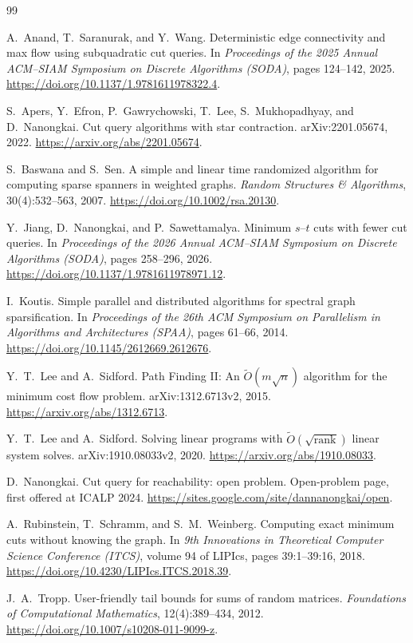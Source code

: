 \documentclass[11pt]{article}
\theoremstyle{definition}
\begin{document}
\small\sloppy
\begin{thebibliography}{99}

A.~Anand, T.~Saranurak, and Y.~Wang.
\newblock Deterministic edge connectivity and max flow using subquadratic
cut queries.
\newblock In \emph{Proceedings of the 2025 Annual ACM--SIAM Symposium on
Discrete Algorithms (SODA)}, pages 124--142, 2025.
\newblock \url{https://doi.org/10.1137/1.9781611978322.4}.

S.~Apers, Y.~Efron, P.~Gawrychowski, T.~Lee, S.~Mukhopadhyay, and
D.~Nanongkai.
\newblock Cut query algorithms with star contraction.
\newblock arXiv:2201.05674, 2022.
\newblock \url{https://arxiv.org/abs/2201.05674}.

S.~Baswana and S.~Sen.
\newblock A simple and linear time randomized algorithm for computing sparse
spanners in weighted graphs.
\newblock \emph{Random Structures \& Algorithms}, 30(4):532--563, 2007.
\newblock \url{https://doi.org/10.1002/rsa.20130}.

Y.~Jiang, D.~Nanongkai, and P.~Sawettamalya.
\newblock Minimum $s$--$t$ cuts with fewer cut queries.
\newblock In \emph{Proceedings of the 2026 Annual ACM--SIAM Symposium on
Discrete Algorithms (SODA)}, pages 258--296, 2026.
\newblock \url{https://doi.org/10.1137/1.9781611978971.12}.

I.~Koutis.
\newblock Simple parallel and distributed algorithms for spectral graph
sparsification.
\newblock In \emph{Proceedings of the 26th ACM Symposium on Parallelism in
Algorithms and Architectures (SPAA)}, pages 61--66, 2014.
\newblock \url{https://doi.org/10.1145/2612669.2612676}.

Y.~T.~Lee and A.~Sidford.
\newblock Path Finding II: An $\widetilde O(m\sqrt n)$ algorithm for the
minimum cost flow problem.
\newblock arXiv:1312.6713v2, 2015.
\newblock \url{https://arxiv.org/abs/1312.6713}.

Y.~T.~Lee and A.~Sidford.
\newblock Solving linear programs with
$\widetilde O(\sqrt{\operatorname{rank}})$ linear system solves.
\newblock arXiv:1910.08033v2, 2020.
\newblock \url{https://arxiv.org/abs/1910.08033}.

D.~Nanongkai.
\newblock Cut query for reachability: open problem.
\newblock Open-problem page, first offered at ICALP 2024.
\newblock \url{https://sites.google.com/site/dannanongkai/open}.

A.~Rubinstein, T.~Schramm, and S.~M.~Weinberg.
\newblock Computing exact minimum cuts without knowing the graph.
\newblock In \emph{9th Innovations in Theoretical Computer Science
Conference (ITCS)}, volume 94 of LIPIcs, pages 39:1--39:16, 2018.
\newblock \url{https://doi.org/10.4230/LIPIcs.ITCS.2018.39}.

J.~A.~Tropp.
\newblock User-friendly tail bounds for sums of random matrices.
\newblock \emph{Foundations of Computational Mathematics}, 12(4):389--434,
2012.
\newblock \url{https://doi.org/10.1007/s10208-011-9099-z}.

\end{thebibliography}
\end{document}
